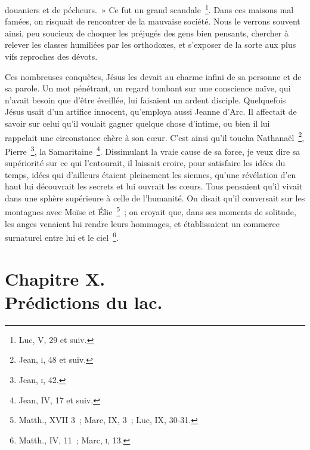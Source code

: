 \documentclass[french,twoside]{book} %
\newcommand\chapteropen{} %
\newcommand\chapterclose{} %
\begin{document}
douaniers et de pécheurs. » Ce fut un grand scandale \footnote{Luc, V, 29 et suiv.}. Dans ces maisons mal famées, on risquait de rencontrer de la mauvaise société. Nous le verrons souvent ainsi, peu soucieux de choquer les préjugés des gens bien pensants, chercher à relever les classes humiliées par les orthodoxes, et s’exposer de la sorte aux plus vifs reproches des dévots.\par
Ces nombreuses conquêtes, Jésus les devait au charme infini de sa personne et de sa parole. Un mot pénétrant, un regard tombant sur une conscience naïve, qui n’avait besoin que d’être éveillée, lui faisaient un ardent disciple. Quelquefois Jésus usait d’un artifice innocent, qu’employa aussi Jeanne d’Arc. Il affectait de savoir sur celui qu’il voulait gagner quelque chose d’intime, ou bien il lui rappelait une circonstance chère à son cœur. C’est ainsi qu’il toucha Nathanaël \footnote{ Jean, \textsc{i}, 48 et suiv.}, Pierre \footnote{ Jean, \textsc{i}, 42.}, la Samaritaine \footnote{Jean, IV, 17 et suiv.}. Dissimulant la vraie cause de sa force, je veux dire sa supériorité sur ce qui l’entourait, il laissait croire, pour satisfaire les idées du temps, idées qui d’ailleurs étaient pleinement les siennes, qu’une révélation d’en haut lui découvrait les secrets et lui ouvrait les cœurs. Tous pensaient qu’il vivait dans une sphère supérieure à celle de l’humanité. On disait qu’il conversait sur les montagnes avec Moïse et Élie \footnote{Matth., XVII 3 ; Marc, IX, 3 ; Luc, IX, 30-31.} ; on croyait que, dans ses moments de solitude, les anges venaient lui rendre leurs hommages, et établissaient un commerce surnaturel entre lui et le ciel \footnote{ Matth., IV, 11 ; Marc, \textsc{i}, 13.}.
\chapterclose


\chapteropen
\chapter[{Chapitre X. Prédictions du lac.}]{Chapitre X.\\
Prédictions du lac.}\renewcommand{\leftmark}{Chapitre X.\\
Prédictions du lac.}
\end{document}
